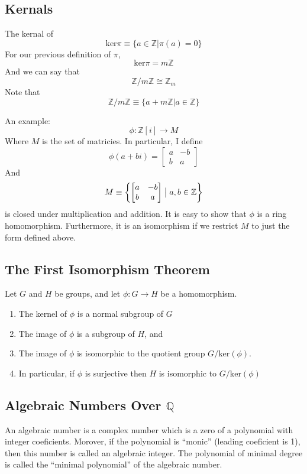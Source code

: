 \documentclass{article}
\begin{document}
\subsection{Kernals}
The kernal of
\[ \text{ker} \pi \equiv \{ a \in \mathbb{Z} | \pi(a) = 0 \} \]
For our previous definition of $\pi$, 
\[ \text{ker} \pi = m \mathbb{Z} \]
And we can say that 
\[ \mathbb{Z}/m\mathbb{Z} \cong \mathbb{Z}_m \]
Note that
\[ \mathbb{Z}/m\mathbb{Z} \equiv \{a + m \mathbb{Z} | a\in \mathbb{Z} \} \]

An example: 
\[ \phi : \mathbb{Z}[i] \rightarrow M \]
Where $M$ is the set of matricies. In particular, I define
\[ \phi(a + bi ) = \begin{bmatrix} a & -b \\ b & a \end{bmatrix}\] 
And 
\[ M \equiv \left\{ \begin{bmatrix} a & -b \\ b & a \end{bmatrix} \bigm| a,b \in
\mathbb{Z} \right\} \]
is closed under multiplication and addition. It is easy to show that $\phi$ is a
ring homomorphism. Furthermore, it is an isomorphism if we restrict $M$ to just
the form defined above. 

\subsection{The First Isomorphism Theorem}

Let $G$ and $H$ be groups, and let $\phi: G\rightarrow H$ be a homomorphism. 
\begin{enumerate}
\item The kernel of $\phi$ is a normal subgroup of $G$
\item The image of $\phi$ is a subgroup of $H$, and
\item The image of $\phi$ is isomorphic to the quotient group $G /
\text{ker}(\phi)$.
\item In particular, if $\phi$ is surjective then $H$ is isomorphic to $G /
\text{ker}(\phi)$
\end{enumerate}

\subsection{Algebraic Numbers Over $\mathbb{Q}$}
An algebraic number is a complex number which is a zero of a polynomial with
integer coeficients. Morover, if the polynomial is ``monic'' (leading coeficient
is 1), then this number is called an algebraic integer. The polynomial of
minimal degree is called the ``minimal polynomial'' of the algebraic number. 
\end{document}
